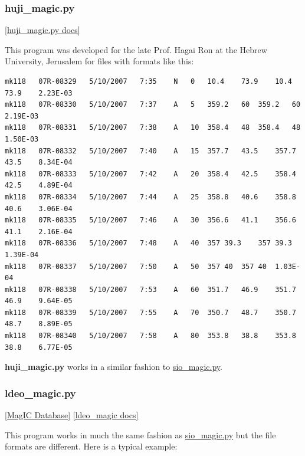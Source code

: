 \documentclass[11pt]{book}
\begin{document}
{{{{\subsubsection{huji\_magic.py}
\href{https://github.com/PmagPy/PmagPy/blob/master/programs/huji_magic.py}{[huji\_magic.py docs]}

This program was developed for the late Prof.  Hagai Ron at the Hebrew University, Jerusalem for files with formats like this:


\begin{verbatim}
mk118	07R-08329	5/10/2007	7:35	N	0	10.4	73.9	10.4	73.9	2.23E-03
mk118	07R-08330	5/10/2007	7:37	A	5	359.2	60	359.2	60	2.19E-03
mk118	07R-08331	5/10/2007	7:38	A	10	358.4	48	358.4	48	1.50E-03
mk118	07R-08332	5/10/2007	7:40	A	15	357.7	43.5	357.7	43.5	8.34E-04
mk118	07R-08333	5/10/2007	7:42	A	20	358.4	42.5	358.4	42.5	4.89E-04
mk118	07R-08334	5/10/2007	7:44	A	25	358.8	40.6	358.8	40.6	3.06E-04
mk118	07R-08335	5/10/2007	7:46	A	30	356.6	41.1	356.6	41.1	2.16E-04
mk118	07R-08336	5/10/2007	7:48	A	40	357	39.3	357	39.3	1.39E-04
mk118	07R-08337	5/10/2007	7:50	A	50	357	40	357	40	1.03E-04
mk118	07R-08338	5/10/2007	7:53	A	60	351.7	46.9	351.7	46.9	9.64E-05
mk118	07R-08339	5/10/2007	7:55	A	70	350.7	48.7	350.7	48.7	8.89E-05
mk118	07R-08340	5/10/2007	7:58	A	80	353.8	38.8	353.8	38.8	6.77E-05
\end{verbatim}

   {\bf huji\_magic.py}  works in a similar fashion to \href{#sio_magic.py}{sio\_magic.py}.


\subsubsection{ldeo\_magic.py}
\href{#MagICDatabase}{[MagIC Database]}
\href{https://github.com/PmagPy/PmagPy/blob/master/programs/ldeo_magic.py}{[ldeo\_magic docs]}


This program works in much the same fashion as \href{#sio_magic.py}{sio\_magic.py} but the file formats are different.  Here is a typical example:

}}}}
\end{document}
